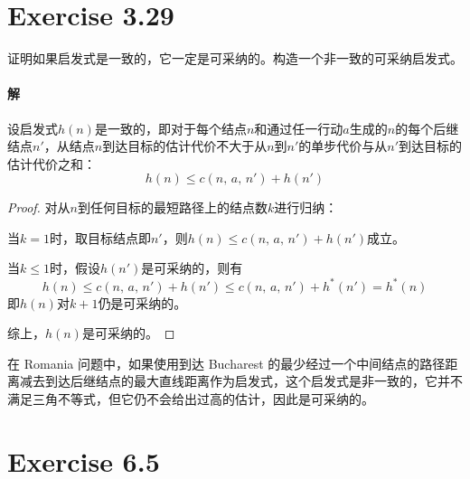 \documentclass{article}
\begin{document}
\section{Exercise 3.29}
证明如果启发式是一致的，它一定是可采纳的。构造一个非一致的可采纳启发式。

\paragraph{解}
设启发式$h(n)$是一致的，即对于每个结点$n$和通过任一行动$a$生成的$n$的每个后继结点$n'$，从结点$n$到达目标的估计代价不大于从$n$到$n'$的单步代价与从$n'$到达目标的估计代价之和：$$h(n) \leq c(n,\, a,\, n') + h(n')$$
\begin{proof}
    对从$n$到任何目标的最短路径上的结点数$k$进行归纳：

    当$k = 1$时，取目标结点即$n'$，则$h(n) \leq c(n,\, a,\, n') + h(n')$成立。

    当$k \leq 1$时，假设$h(n')$是可采纳的，则有
    \begin{equation*}
        h(n) \leq c(n,\, a,\, n') + h(n') \leq c(n,\, a,\, n') + h^*(n') = h^*(n)
    \end{equation*}
    即$h(n)$对$k + 1$仍是可采纳的。

    综上，$h(n)$是可采纳的。
\end{proof}
在 Romania 问题中，如果使用到达 Bucharest 的最少经过一个中间结点的路径距离减去到达后继结点的最大直线距离作为启发式，这个启发式是非一致的，它并不满足三角不等式，但它仍不会给出过高的估计，因此是可采纳的。

\section{Exercise 6.5}
\end{document}

